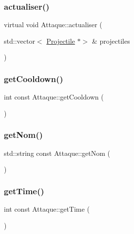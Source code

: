 \subsubsection{\texorpdfstring{actualiser()}{actualiser()}}
{\footnotesize\ttfamily virtual void Attaque\+::actualiser (\begin{DoxyParamCaption}\item[{std\+::vector$<$ \hyperlink{class_projectile}{Projectile} $\ast$$>$ \&}]{projectiles }\end{DoxyParamCaption})\hspace{0.3cm}{\ttfamily [pure virtual]}}

\mbox{\label{class_attaque_a7b220e885016c73f4631b8130bd9bc4a}} 
\subsubsection{\texorpdfstring{get\+Cooldown()}{getCooldown()}}
{\footnotesize\ttfamily int const Attaque\+::get\+Cooldown (\begin{DoxyParamCaption}{ }\end{DoxyParamCaption})\hspace{0.3cm}{\ttfamily [inline]}}

\mbox{\label{class_attaque_a5a56f274de25d8743e651ce20134098a}} 
\subsubsection{\texorpdfstring{get\+Nom()}{getNom()}}
{\footnotesize\ttfamily std\+::string const Attaque\+::get\+Nom (\begin{DoxyParamCaption}{ }\end{DoxyParamCaption})\hspace{0.3cm}{\ttfamily [inline]}}

\mbox{\label{class_attaque_aeba93e1b165ac146ca037e35689c707d}} 
\subsubsection{\texorpdfstring{get\+Time()}{getTime()}}
{\footnotesize\ttfamily int const Attaque\+::get\+Time (\begin{DoxyParamCaption}{ }\end{DoxyParamCaption})\hspace{0.3cm}{\ttfamily [inline]}}

